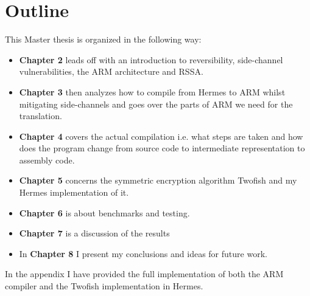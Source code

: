 \section{Outline}
This Master thesis is organized in the following way:
\begin{itemize}
  \item \textbf{Chapter 2} leads off with an introduction to reversibility, side-channel vulnerabilities, the ARM architecture and RSSA.
  \item \textbf{Chapter 3} then analyzes how to compile from Hermes to ARM whilst mitigating side-channels and goes over the parts of ARM we need for the translation.
  \item \textbf{Chapter 4} covers the actual compilation i.e. what steps are taken and how does the program change from source code to intermediate representation to assembly code.
  \item \textbf{Chapter 5} concerns the symmetric encryption algorithm Twofish and my Hermes implementation of it.
  \item \textbf{Chapter 6} is about benchmarks and testing.
  \item \textbf{Chapter 7} is a discussion of the results
  \item In \textbf{Chapter 8} I present my conclusions and ideas for future work.
\end{itemize}
In the appendix I have provided the full implementation of both the ARM compiler and the Twofish implementation in Hermes.
